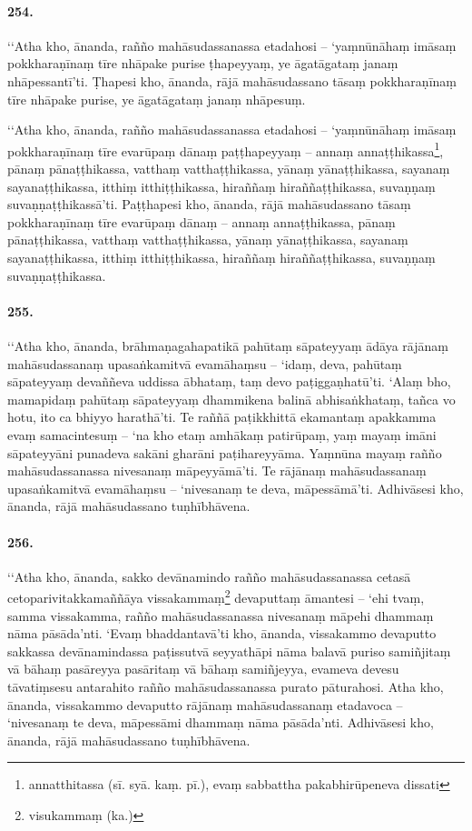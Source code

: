 \paragraph{254.} ‘‘Atha kho, ānanda, rañño mahāsudassanassa etadahosi – ‘yaṃnūnāhaṃ imāsaṃ pokkharaṇīnaṃ tīre nhāpake purise ṭhapeyyaṃ, ye āgatāgataṃ janaṃ nhāpessantī’ti. Ṭhapesi kho, ānanda, rājā mahāsudassano tāsaṃ pokkharaṇīnaṃ tīre nhāpake purise, ye āgatāgataṃ janaṃ nhāpesuṃ.

‘‘Atha kho, ānanda, rañño mahāsudassanassa etadahosi – ‘yaṃnūnāhaṃ imāsaṃ pokkharaṇīnaṃ tīre evarūpaṃ dānaṃ paṭṭhapeyyaṃ – annaṃ annaṭṭhikassa\footnote{annatthitassa (sī. syā. kaṃ. pī.), evaṃ sabbattha pakabhirūpeneva dissati}, pānaṃ pānaṭṭhikassa, vatthaṃ vatthaṭṭhikassa, yānaṃ yānaṭṭhikassa, sayanaṃ sayanaṭṭhikassa, itthiṃ itthiṭṭhikassa, hiraññaṃ hiraññaṭṭhikassa, suvaṇṇaṃ suvaṇṇaṭṭhikassā’ti. Paṭṭhapesi kho, ānanda, rājā mahāsudassano tāsaṃ pokkharaṇīnaṃ tīre evarūpaṃ dānaṃ – annaṃ annaṭṭhikassa, pānaṃ pānaṭṭhikassa, vatthaṃ vatthaṭṭhikassa, yānaṃ yānaṭṭhikassa, sayanaṃ sayanaṭṭhikassa, itthiṃ itthiṭṭhikassa, hiraññaṃ hiraññaṭṭhikassa, suvaṇṇaṃ suvaṇṇaṭṭhikassa.

\paragraph{255.} ‘‘Atha kho, ānanda, brāhmaṇagahapatikā pahūtaṃ sāpateyyaṃ ādāya rājānaṃ mahāsudassanaṃ upasaṅkamitvā evamāhaṃsu – ‘idaṃ, deva, pahūtaṃ sāpateyyaṃ devaññeva uddissa ābhataṃ, taṃ devo paṭiggaṇhatū’ti. ‘Alaṃ bho, mamapidaṃ pahūtaṃ sāpateyyaṃ dhammikena balinā abhisaṅkhataṃ, tañca vo hotu, ito ca bhiyyo harathā’ti. Te raññā paṭikkhittā ekamantaṃ apakkamma evaṃ samacintesuṃ – ‘na kho etaṃ amhākaṃ patirūpaṃ, yaṃ mayaṃ imāni sāpateyyāni punadeva sakāni gharāni paṭihareyyāma. Yaṃnūna mayaṃ rañño mahāsudassanassa nivesanaṃ māpeyyāmā’ti. Te rājānaṃ mahāsudassanaṃ upasaṅkamitvā evamāhaṃsu – ‘nivesanaṃ te deva, māpessāmā’ti. Adhivāsesi kho, ānanda, rājā mahāsudassano tuṇhībhāvena.

\paragraph{256.} ‘‘Atha kho, ānanda, sakko devānamindo rañño mahāsudassanassa cetasā cetoparivitakkamaññāya vissakammaṃ\footnote{visukammaṃ (ka.)} devaputtaṃ āmantesi – ‘ehi tvaṃ, samma vissakamma, rañño mahāsudassanassa nivesanaṃ māpehi dhammaṃ nāma pāsāda’nti. ‘Evaṃ bhaddantavā’ti kho, ānanda, vissakammo devaputto sakkassa devānamindassa paṭissutvā seyyathāpi nāma balavā puriso samiñjitaṃ vā bāhaṃ pasāreyya pasāritaṃ vā bāhaṃ samiñjeyya, evameva devesu tāvatiṃsesu antarahito rañño mahāsudassanassa purato pāturahosi. Atha kho, ānanda, vissakammo devaputto rājānaṃ mahāsudassanaṃ etadavoca – ‘nivesanaṃ te deva, māpessāmi dhammaṃ nāma pāsāda’nti. Adhivāsesi kho, ānanda, rājā mahāsudassano tuṇhībhāvena.

